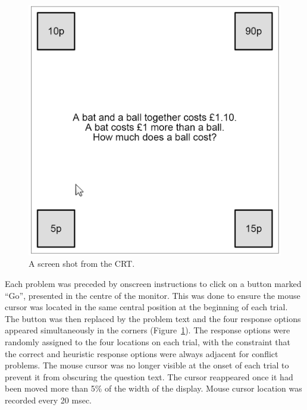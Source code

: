 \begin{figure}[ht]
  \centering
  \includegraphics[width=\figurewidth]{imgs/exp6-screenshot.png}
  \caption[A screen shot from the CRT, Experiment 6.]{
    \label{fig:exp6-screenshot}
    A screen shot from the CRT.
  }
\end{figure}

Each problem was preceded by onscreen instructions to
click on a button marked ``Go'', presented in the centre of the monitor.
This was done to ensure the mouse cursor was located
in the same central position at the beginning of each trial.
The button was then replaced by the problem text
and the four response options appeared simultaneously in the corners
(Figure~\ref{fig:exp6-screenshot}).
The response options were randomly assigned to the four locations on each trial,
with the constraint that the correct and heuristic response options
were always adjacent for conflict problems.
The mouse cursor was no longer visible at the onset of each trial
to prevent it from obscuring the question text.
The cursor reappeared once it had been moved more than 5\% of the width of the display.
Mouse cursor location was recorded every 20 msec.
